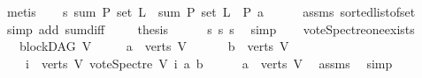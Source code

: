 \begin{isabellebody}
\ metis\isanewline
\ \ \isamarkupfalse%
\ s{\isacharunderscore}{\kern0pt}{}{\isacharcolon}{\kern0pt}\ {\isachardoublequoteopen}sum\ P\ {\isacharparenleft}{\kern0pt}set\ {\isacharquery}{\kern0pt}L{}{\isacharparenright}{\kern0pt}\ {\isacharequal}{\kern0pt}\ sum\ P\ {\isacharparenleft}{\kern0pt}set\ {\isacharquery}{\kern0pt}L{}{\isacharparenright}{\kern0pt}\ {\isacharminus}{\kern0pt}\ {\isacharparenleft}{\kern0pt}P\ a{\isacharparenright}{\kern0pt}{\isachardoublequoteclose}\isanewline
\ \ \ \ \isamarkupfalse%
\ assms\ sorted{\isacharunderscore}{\kern0pt}list{\isacharunderscore}{\kern0pt}of{\isacharunderscore}{\kern0pt}set{\isacharparenleft}{\kern0pt}{}{\isacharparenright}{\kern0pt}\isanewline
\ \ \ \ \isamarkupfalse%
\ {\isacharparenleft}{\kern0pt}simp\ add{\isacharcolon}{\kern0pt}\ sum{\isacharunderscore}{\kern0pt}diff{}{\isacharparenright}{\kern0pt}\ \isanewline
\ \ \isamarkupfalse%
\ {\isacharquery}{\kern0pt}thesis\isanewline
\ \ \ \ \isamarkupfalse%
\ s{\isacharunderscore}{\kern0pt}{}\ s{\isacharunderscore}{\kern0pt}{}\ s{\isacharunderscore}{\kern0pt}{}\ \isamarkupfalse%
\ simp\isanewline
{}\isamarkupfalse%
%
\endisatagproof
{\isafoldproof}%
%
\isadelimproof
\ \ \isanewline
%
\endisadelimproof
\isanewline
{}\isamarkupfalse%
\ vote{\isacharunderscore}{\kern0pt}Spectre{\isacharunderscore}{\kern0pt}one{\isacharunderscore}{\kern0pt}exists{\isacharcolon}{\kern0pt}\isanewline
\ \ \ {\isachardoublequoteopen}blockDAG\ V{\isachardoublequoteclose}\isanewline
\ \ \ \ \ {\isachardoublequoteopen}a\ {\isasymin}\ verts\ V{\isachardoublequoteclose}\ \isanewline
\ \ \ \ \ {\isachardoublequoteopen}b\ {\isasymin}\ verts\ V{\isachardoublequoteclose}\ \isanewline
\ \ \ {\isachardoublequoteopen}{\isasymexists}\ i\ {\isasymin}\ verts\ V{\isachardot}{\kern0pt}\ vote{\isacharunderscore}{\kern0pt}Spectre\ V\ i\ a\ b\ {\isasymnoteq}\ {}{\isachardoublequoteclose}\isanewline
%
\isadelimproof
%
\endisadelimproof
%
\isatagproof
{}\isamarkupfalse%
\isanewline
\ \ \isamarkupfalse%
\ {\isachardoublequoteopen}a\ {\isasymin}\ verts\ V{\isachardoublequoteclose}\ \isamarkupfalse%
\ assms{\isacharparenleft}{\kern0pt}{}{\isacharparenright}{\kern0pt}\ \isamarkupfalse%
\ simp\isanewline
\ \ \isamarkupfalse%

\end{isabellebody}
